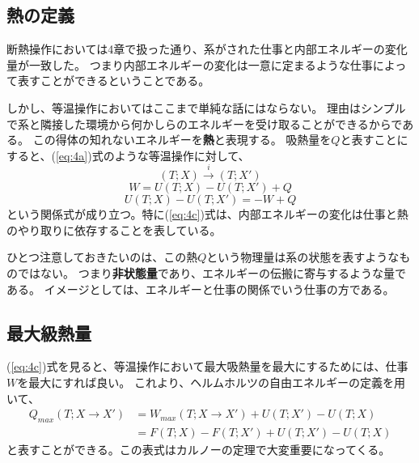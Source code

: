 \documentclass[a4paper]{jsreport}
\begin{document}
            \subsection*{熱の定義}
                断熱操作においては4章で扱った通り、系がされた仕事と内部エネルギーの変化量が一致した。
                つまり内部エネルギーの変化は一意に定まるような仕事によって表すことができるということである。\par
                しかし、等温操作においてはここまで単純な話にはならない。
                理由はシンプルで系と隣接した環境から何かしらのエネルギーを受け取ることができるからである。
                この得体の知れないエネルギーを\textbf{熱}と表現する。
                吸熱量を$Q$と表すことにすると、(\ref{eq:4a})式のような等温操作に対して、
                \begin{equation} \label{eq:4a}
                    (T; X) \xrightarrow{i} (T; X')
                \end{equation}
                \begin{equation} \label{eq:4b}
                    W = U(T; X) - U(T; X') + Q
                \end{equation}
                \begin{equation} \label{eq:4c}
                    U(T; X) - U(T; X') = -W + Q
                \end{equation}
                という関係式が成り立つ。特に(\ref{eq:4c})式は、内部エネルギーの変化は仕事と熱のやり取りに依存することを表している。\par
                ひとつ注意しておきたいのは、この熱$Q$という物理量は系の状態を表すようなものではない。
                つまり\textbf{非状態量}であり、エネルギーの伝搬に寄与するような量である。
                イメージとしては、エネルギーと仕事の関係でいう仕事の方である。

            \subsection*{最大級熱量}
                (\ref{eq:4c})式を見ると、等温操作において最大吸熱量を最大にするためには、仕事$W$を最大にすれば良い。
                これより、ヘルムホルツの自由エネルギーの定義を用いて、
                \begin{align}
                    Q_{max}(T; X \xrightarrow{} X') 
                    &= W_{max}(T; X \xrightarrow{} X') + U(T; X') - U(T; X) \\
                    &= F(T; X) - F(T; X') + U(T; X') - U(T; X)
                \end{align}
                と表すことができる。この表式はカルノーの定理で大変重要になってくる。
\end{document}
